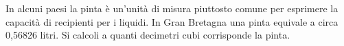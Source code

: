 In alcuni paesi la pinta è un'unità di misura piuttosto comune 
per esprimere la capacità di recipienti per i liquidi. 
In Gran Bretagna una pinta equivale a circa 0,56826 litri. 
Si calcoli a quanti decimetri cubi corrisponde la pinta.
